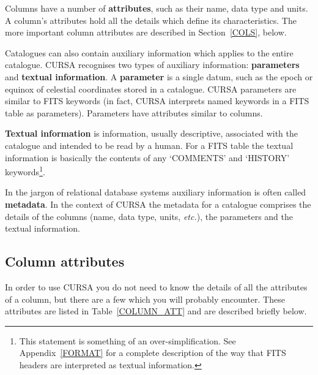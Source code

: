 \documentclass[twoside,11pt]{starlink}
\begin{document}
Columns have a number of \textbf{attributes}, such as their name, data type
and units. A column's attributes hold all the details which define its
characteristics.  The more important column attributes are described
in Section~\ref{COLS}, below.

Catalogues can also contain auxiliary information which applies to the
entire catalogue. CURSA recognises two types of auxiliary information:
\textbf{parameters} and \textbf{textual information}. A \textbf{parameter} is
a single datum, such as the epoch or equinox of celestial coordinates stored
in a catalogue. CURSA parameters are similar to FITS keywords (in
fact, CURSA interprets named keywords in a FITS table as parameters).
Parameters have attributes similar to columns.

\textbf{Textual information} is information, usually descriptive,
associated with the catalogue and intended to be read by a human. For a
FITS table the textual information is basically the contents of any
`COMMENTS' and `HISTORY' keywords\footnote{This statement is something
of an over-simplification. See Appendix~\ref{FORMAT} for a complete
description of the way that FITS headers are interpreted as textual
information.}.

In the jargon of relational database systems auxiliary information is
often called \textbf{metadata}.  In the context of CURSA the metadata for
a catalogue comprises the details of the columns (name, data type,
units, \emph{etc.}), the parameters and the textual information.


\subsection{\label{COLS}Column attributes}

In order to use CURSA you do not need to know the details of all the
attributes of a column, but there are a few which you will probably
encounter. These attributes are listed in Table~\ref{COLUMN_ATT} and are
described briefly below.
\end{document}
